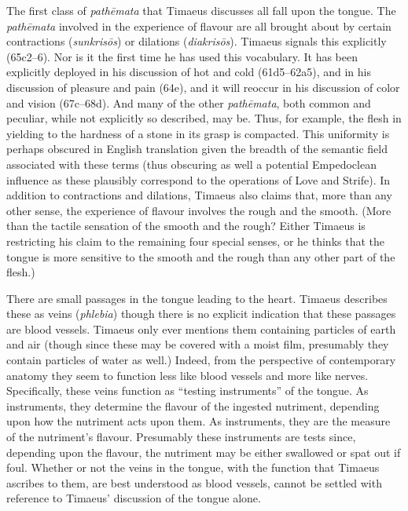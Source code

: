 The first class of \emph{pathēmata} that Timaeus discusses all fall upon the tongue. The \emph{pathēmata} involved in the experience of flavour are all brought about by certain contractions (\emph{sunkrisōs}) or dilations (\emph{diakrisōs}). Timaeus signals this explicitly (65c2--6). Nor is it the first time he has used this vocabulary. It has been explicitly deployed in his discussion of hot and cold (61d5–62a5), and in his discussion of pleasure and pain (64e), and it will reoccur in his discussion of color and vision (67c–68d). And many of the other \emph{pathēmata}, both common and peculiar, while not explicitly so described, may be. Thus, for example, the flesh in yielding to the hardness of a stone in its grasp is compacted. This uniformity is perhaps obscured in English translation given the breadth of the semantic field associated with these terms (thus obscuring as well a potential Empedoclean influence as these plausibly correspond to the operations of Love and Strife). In addition to contractions and dilations, Timaeus also claims that, more than any other sense, the experience of flavour involves the rough and the smooth. (More than the tactile sensation of the smooth and the rough? Either Timaeus is restricting his claim to the remaining four special senses, or he thinks that the tongue is more sensitive to the smooth and the rough than any other part of the flesh.)

There are small passages in the tongue leading to the heart. Timaeus describes these as veins (\emph{phlebia}) though there is no explicit indication that these passages are blood vessels. Timaeus only ever mentions them containing particles of earth and air (though since these may be covered with a moist film, presumably they contain particles of water as well.) Indeed, from the perspective of contemporary anatomy they seem to function less like blood vessels and more like nerves. Specifically, these veins function as ``testing instruments'' of the tongue. As instruments, they determine the flavour of the ingested nutriment, depending upon how the nutriment acts upon them. As instruments, they are the measure of the nutriment's flavour. Presumably these instruments are tests since, depending upon the flavour, the nutriment may be either swallowed or spat out if foul. Whether or not the veins in the tongue, with the function that Timaeus ascribes to them, are best understood as blood vessels, cannot be settled with reference to Timaeus' discussion of the tongue alone.

